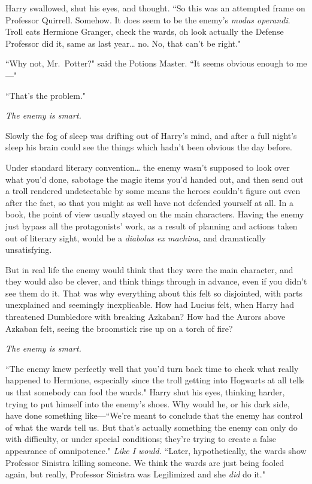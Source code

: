 Harry swallowed, shut his eyes, and thought. ``So this was an attempted frame on Professor Quirrell. Somehow. It does seem to be the enemy's \emph{modus operandi}. Troll eats Hermione Granger, check the wards, oh look actually the Defense Professor did it, same as last year{\ldots} no. No, that can't be right."

``Why not, Mr.~Potter?" said the Potions Master. ``It seems obvious enough to me---"

``That's the problem."

\emph{The enemy is smart.}

Slowly the fog of sleep was drifting out of Harry's mind, and after a full night's sleep his brain could see the things which hadn't been obvious the day before.

Under standard literary convention{\ldots} the enemy wasn't supposed to look over what you'd done, sabotage the magic items you'd handed out, and then send out a troll rendered undetectable by some means the heroes couldn't figure out even after the fact, so that you might as well have not defended yourself at all. In a book, the point of view usually stayed on the main characters. Having the enemy just bypass all the protagonists' work, as a result of planning and actions taken out of literary sight, would be a \emph{diabolus ex machina}, and dramatically unsatisfying.

But in real life the enemy would think that they were the main character, and they would also be clever, and think things through in advance, even if you didn't see them do it. That was why everything about this felt so disjointed, with parts unexplained and seemingly inexplicable. How had Lucius felt, when Harry had threatened Dumbledore with breaking Azkaban? How had the Aurors above Azkaban felt, seeing the broomstick rise up on a torch of fire?

\emph{The enemy is smart.}

``The enemy knew perfectly well that you'd turn back time to check what really happened to Hermione, especially since the troll getting into Hogwarts at all tells us that somebody can fool the wards." Harry shut his eyes, thinking harder, trying to put himself into the enemy's shoes. Why would he, or his dark side, have done something like---``We're meant to conclude that the enemy has control of what the wards tell us. But that's actually something the enemy can only do with difficulty, or under special conditions; they're trying to create a false appearance of omnipotence." \emph{Like I would.} ``Later, hypothetically, the wards show Professor Sinistra killing someone. We think the wards are just being fooled again, but really, Professor Sinistra was Legilimized and she \emph{did} do it."

